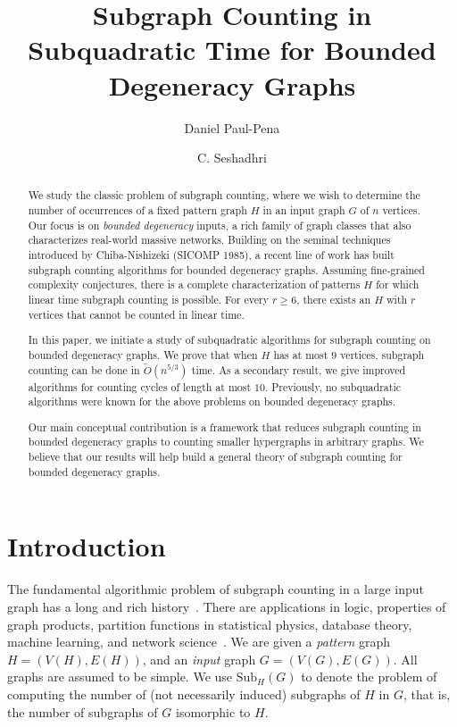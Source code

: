 \documentclass[a4paper,UKenglish,cleveref, autoref, numberwithinsect, thm-restate]{lipics-v2021}
\title{Subgraph Counting in Subquadratic Time for Bounded Degeneracy Graphs}
\author{Daniel Paul-Pena}{University of California, Santa Cruz, United States }{dpaulpen@ucsc.edu}{https://orcid.org/0009-0008-1073-6173}{}
\author{C. Seshadhri}{University of California, Santa Cruz, United States}{sesh@ucsc.edu}{https://orcid.org/0000-0003-2163-3555}{}
\newcommand{\Sub}[2]{\mathrm{Sub}_{#2}(#1)}
\begin{document}
	
	\maketitle
	
	\begin{abstract}
		We study the classic problem of subgraph counting, where we wish to determine the number of occurrences of a fixed pattern graph $H$ in an input graph $G$ of $n$ vertices. Our focus is on \emph{bounded degeneracy} inputs, a rich family of graph classes that also characterizes real-world massive networks. 
		Building on the seminal techniques introduced by Chiba-Nishizeki (SICOMP 1985), a recent line of work has built subgraph counting algorithms for bounded degeneracy graphs. Assuming fine-grained complexity conjectures, there is a complete characterization of patterns $H$ for which linear time subgraph counting is possible. For every $r \geq 6$, there exists an $H$ with $r$ vertices that cannot be counted in linear time.
		
		In this paper, we initiate a study of subquadratic algorithms for subgraph counting on bounded degeneracy graphs. We prove that when $H$ has at most $9$ vertices, subgraph counting can be done in $\tilde{O}(n^{5/3})$ time. As a secondary result, we give improved algorithms for counting cycles of length at most $10$. Previously, no subquadratic algorithms were known for the above problems on bounded degeneracy graphs. 
		
		Our main conceptual contribution is a framework that reduces subgraph counting in bounded degeneracy graphs to counting smaller hypergraphs in arbitrary graphs. We believe that our results will help build a general theory of subgraph counting for bounded degeneracy graphs.
	\end{abstract}
	
	
	\section{Introduction} \label{sec:intro}
	
	The fundamental algorithmic problem of subgraph counting in a large input graph has a long
	and rich history~\cite{Lo67, DiSeTh02, FlGr04, DaJo04, Lo12, AhNeRo+15, CuDeMa17, PiSeVi17, SeTi19}.
	There are applications in logic, properties of graph products, partition functions in statistical physics, database theory, machine learning, and network science~\cite{ChMe77,BrWi99,DrRi10,BoChLo+06,PiSeVi17,DeRoWe19,PaSe20}. 
	We are given a \emph{pattern} graph $H = (V(H), E(H))$, and an \emph{input} graph $G = (V(G), E(G))$.
	All graphs are assumed to be simple. We use $\Sub{G}{H}$ to denote the problem of computing the number of (not necessarily induced) subgraphs of $H$ in $G$, that is, the number of subgraphs of $G$ isomorphic to $H$. 
	
\end{document}
